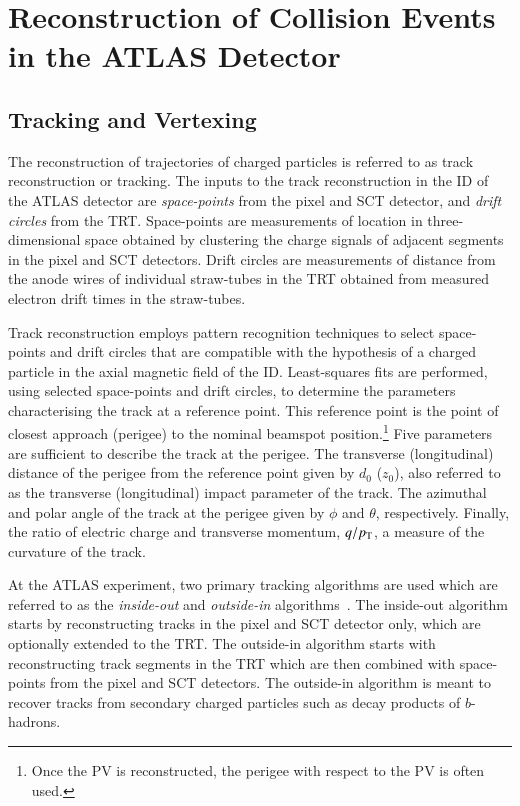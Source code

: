 \section{Reconstruction of Collision Events in the ATLAS Detector}%
\label{sec:object_reco_at_atlas}



\subsection{Tracking and Vertexing}

The reconstruction of trajectories of charged particles is referred to as track
reconstruction or tracking. The inputs to the track reconstruction in the ID of
the ATLAS detector are \emph{space-points} from the pixel and SCT detector, and
\emph{drift circles} from the TRT. Space-points are measurements of location in
three-dimensional space obtained by clustering the charge signals of adjacent
segments in the pixel and SCT detectors. Drift circles are measurements of
distance from the anode wires of individual straw-tubes in the TRT obtained from
measured electron drift times in the straw-tubes.

Track reconstruction employs pattern recognition techniques to select
space-points and drift circles that are compatible with the hypothesis of a
charged particle in the axial magnetic field of the ID. Least-squares fits are
performed, using selected space-points and drift circles, to determine the
parameters characterising the track at a reference point. This reference point
is the point of closest approach (perigee) to the nominal beamspot
position.\footnote{Once the PV is reconstructed, the perigee with respect to the
  PV is often used.} Five parameters are sufficient to describe the track at the
perigee. The transverse (longitudinal) distance of the perigee from the
reference point given by $d_0$ ($z_0$), also referred to as the transverse
(longitudinal) impact parameter of the track. The azimuthal and polar angle of
the track at the perigee given by $\phi$ and $\theta$, respectively. Finally,
the ratio of electric charge and transverse momentum, $q / p_{\text{T}}$, a measure of
the curvature of the track.

At the ATLAS experiment, two primary tracking algorithms are used which are
referred to as the \emph{inside-out} and \emph{outside-in}
algorithms~\cite{Cornelissen:2007vba,Salzburger:2015sgq,PERF-2015-08}. The
inside-out algorithm starts by reconstructing tracks in the pixel and SCT
detector only, which are optionally extended to the TRT. The outside-in
algorithm starts with reconstructing track segments in the TRT which are then
combined with space-points from the pixel and SCT detectors. The outside-in
algorithm is meant to recover tracks from secondary charged particles such as
decay products of $b$-hadrons.

